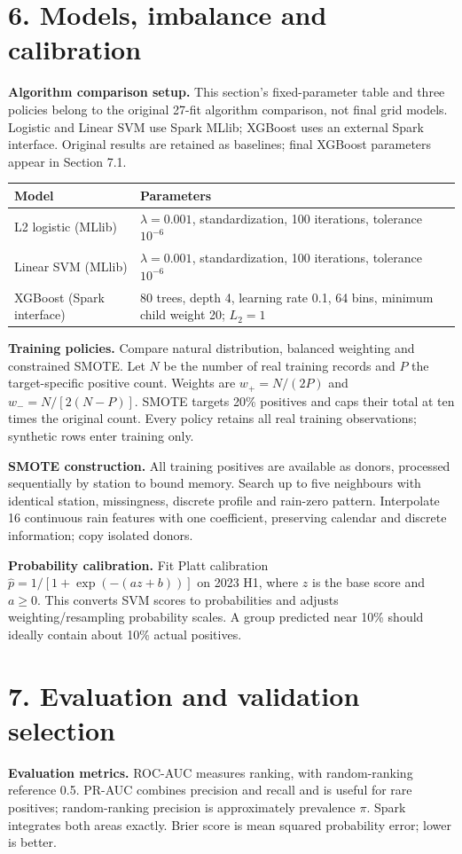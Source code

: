 \documentclass[UTF8,fontset=fandol,10pt,a4paper,landscape]{ctexart}
\begin{document}
\endgroup
\clearpage\section*{6. Models, imbalance and calibration}
\textbf{Algorithm comparison setup.} This section's fixed-parameter table and three policies belong to the original 27-fit algorithm comparison, not final grid models. Logistic and Linear SVM use Spark MLlib; XGBoost uses an external Spark interface. Original results are retained as baselines; final XGBoost parameters appear in Section 7.1.
\begin{center}\begin{tabular}{p{6cm}p{17cm}}\toprule
Model & Parameters\\\midrule
L2 logistic (MLlib) & $\lambda=0.001$, standardization, 100 iterations, tolerance $10^{-6}$\\
Linear SVM (MLlib) & $\lambda=0.001$, standardization, 100 iterations, tolerance $10^{-6}$\\
XGBoost (Spark interface) & 80 trees, depth 4, learning rate 0.1, 64 bins, minimum child weight 20; $L_2=1$\\
\bottomrule\end{tabular}\end{center}

\textbf{Training policies.} Compare natural distribution, balanced weighting and constrained SMOTE. Let $N$ be the number of real training records and $P$ the target-specific positive count. Weights are $w_+=N/(2P)$ and $w_-=N/[2(N-P)]$. SMOTE targets 20\% positives and caps their total at ten times the original count. Every policy retains all real training observations; synthetic rows enter training only.

\textbf{SMOTE construction.} All training positives are available as donors, processed sequentially by station to bound memory. Search up to five neighbours with identical station, missingness, discrete profile and rain-zero pattern. Interpolate 16 continuous rain features with one coefficient, preserving calendar and discrete information; copy isolated donors.

\textbf{Probability calibration.} Fit Platt calibration $\hat p=1/[1+\exp(-(az+b))]$ on 2023 H1, where $z$ is the base score and $a\geq0$. This converts SVM scores to probabilities and adjusts weighting/resampling probability scales. A group predicted near 10\% should ideally contain about 10\% actual positives.

\clearpage\section*{7. Evaluation and validation selection}
\textbf{Evaluation metrics.} ROC-AUC measures ranking, with random-ranking reference 0.5. PR-AUC combines precision and recall and is useful for rare positives; random-ranking precision is approximately prevalence $\pi$. Spark integrates both areas exactly. Brier score is mean squared probability error; lower is better.
\end{document}
